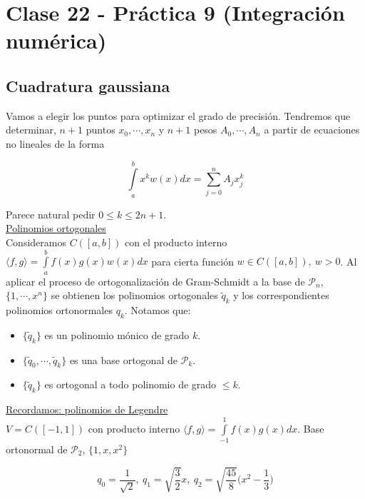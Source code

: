 \section{Clase 22 - Pr\'actica 9 (Integraci\'on num\'erica)}

\subsection{Cuadratura gaussiana}

Vamos a elegir los puntos para optimizar el grado de precisi\'on. Tendremos que determinar, $n + 1$ puntos $x_{0}, \cdots, x_{n}$ y $n + 1$ pesos $A_{0}, \cdots, A_{n}$ a partir de ecuaciones no lineales de la forma

$$\int \limits_{a}^{b} x^{k}w(x)dx = \sum \limits_{j = 0}^{n}A_{j}x_{j}^{k}$$

Parece natural pedir $0 \leq k \leq 2n + 1$.\\

\underline{Polinomios ortogonales}\\

Consideramos $C([a, b])$ con el producto interno $\langle f, g \rangle = \int \limits_{a}^{b} f(x)g(x)w(x)dx$ para cierta funci\'on $w \in C([a, b]),\ w > 0$. Al aplicar el proceso de ortogonalizaci\'on de Gram-Schmidt a la base de $\mathcal{P}_{n}$, $\{1, \cdots, x^{n}\}$ se obtienen los polinomios ortogonales $\tilde{q}_{k}$ y los correspondientes polinomios ortonormales $q_{k}$. Notamos que:

\begin{itemize}
	\item $\{\tilde{q}_{k}\}$ es un polinomio m\'onico de grado $k$.
	
	\item $\{\tilde{q}_{0}, \cdots, \tilde{q}_{k}\}$ es una base ortogonal de $\mathcal{P}_{k}$.
	
	\item $\{\tilde{q}_{k}\}$ es ortogonal a todo polinomio de grado $\leq k$.\\
\end{itemize}

\underline{Recordamos: polinomios de Legendre}\\

$V = C([-1, 1])$ con producto interno $\langle f, g \rangle = \int \limits_{-1}^{1} f(x)g(x)dx$. Base ortonormal de $\mathcal{P}_{2}$, $\{1, x, x^{2}\}$

$$q_{0} = \frac{1}{\sqrt{2}},\ q_{1} = \sqrt{\frac{3}{2}}x,\ q_{2} = \sqrt{\frac{45}{8}}\bigg(x^{2} - \frac{1}{3}\bigg)$$\\

